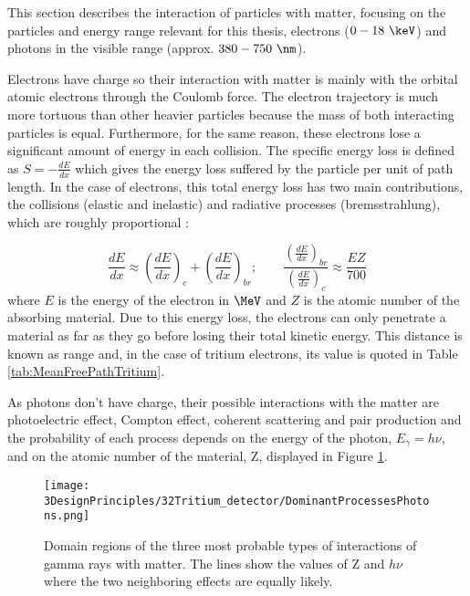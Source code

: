 This section describes the interaction of particles with matter, focusing on the particles and energy range relevant for this thesis, electrons ($0-18~\keV$) and photons in the visible range (approx. $380-750~\nm$).

Electrons have charge so their interaction with matter is mainly with the orbital atomic  electrons through the Coulomb force. The electron trajectory is much more tortuous than other heavier particles because the mass of both interacting particles is equal. Furthermore, for the same reason, these electrons lose a significant amount of energy in each collision. The specific energy loss is defined as $S=-\frac{dE}{dx}$ which gives the energy loss suffered by the particle per unit of path length. In the case of electrons, this total energy loss has two main contributions, the collisions (elastic and inelastic) and radiative processes (bremsstrahlung), which are roughly proportional \cite{Knoll, Leo}:

\begin{equation}
\frac{dE}{dx} \approx \left(\frac{dE}{dx}\right)_{c} + \left(\frac{dE}{dx}\right)_{br} ; \qquad \frac{\displaystyle{\left(\frac{dE}{dx}\right)_{br}}}{\displaystyle{\left(\frac{dE}{dx}\right)_{c}}} \approx \frac{EZ}{700}
\label{eq:ElectronInteraction}
\end{equation}
where $E$ is the energy of the electron in $\MeV$ and $Z$ is the atomic number of the absorbing material. Due to this energy loss, the electrons can only penetrate a material as far as they go before losing their total kinetic energy. This distance is known as range and, in the case of tritium electrons, its value is quoted in Table \ref{tab:MeanFreePathTritium}.

As photons don't have charge, their possible interactions with the matter are photoelectric effect, Compton effect, coherent scattering and pair production and the probability of each process depends on the energy of the photon, $E_\gamma = h\nu$, and on the atomic number of the material, Z, displayed in Figure \ref{fig:ProcessesPhotons}.

\begin{figure}[h]
\centering
\texttt{[image: 3DesignPrinciples/32Tritium\_detector/DominantProcessesPhotons.png]}
\caption{Domain regions of the three most probable types of interactions of gamma rays with matter. The lines show the values of Z and $h\nu$ where the two neighboring effects are equally likely.\label{fig:ProcessesPhotons}~\cite{Knoll, Leo}}
\end{figure}

